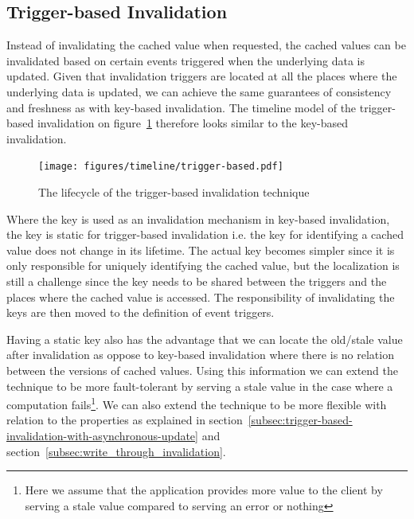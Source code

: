 

\subsection{Trigger-based Invalidation}
\label{subsec:trigger_based_invalidation}

Instead of invalidating the cached value when requested, the cached values can be invalidated based on certain events triggered when the underlying data is updated. Given that invalidation triggers are located at all the places where the underlying data is updated, we can achieve the same guarantees of consistency and freshness as with key-based invalidation. The timeline model of the trigger-based invalidation on figure~\ref{fig:timeline:trigger-based} therefore looks similar to the key-based invalidation.

\begin{figure}[ht!]
  \centering
  \texttt{[image: figures/timeline/trigger-based.pdf]}
  \caption{The lifecycle of the trigger-based invalidation technique}
  \label{fig:timeline:trigger-based}
\end{figure}

Where the key is used as an invalidation mechanism in key-based invalidation, the key is static for trigger-based invalidation i.e. the key for identifying a cached value does not change in its lifetime. The actual key becomes simpler since it is only responsible for uniquely identifying the cached value, but the localization is still a challenge since the key needs to be shared between the triggers and the places where the cached value is accessed. The responsibility of invalidating the keys are then moved to the definition of event triggers.

Having a static key also has the advantage that we can locate the old/stale value after invalidation as oppose to key-based invalidation where there is no relation between the versions of cached values. Using this information we can extend the technique to be more fault-tolerant by serving a stale value in the case where a computation fails\footnote{Here we assume that the application provides more value to the client by serving a stale value compared to serving an error or nothing}. We can also extend the technique to be more flexible with relation to the properties as explained in section~\ref{subsec:trigger-based-invalidation-with-asynchronous-update} and section~\ref{subsec:write_through_invalidation}.

